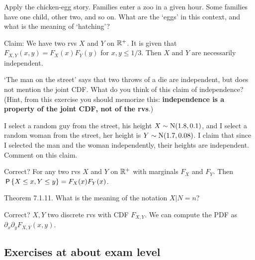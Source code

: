 \documentclass[assignments]{subfiles}
\begin{document}
\begin{exercise}
Apply the chicken-egg story. Families enter a zoo in a given hour. Some families have one child, other two, and so on. 
What are the `eggs' in this context, and what is the meaning of `hatching'? 
\end{exercise}


\begin{exercise}
Claim: We have two rvs $X$ and $Y$ on $\R^{+}$. It is given that $F_{X,Y}(x,y) = F_X(x)F_Y(y)$ for $x,y \leq 1/3$. Then  $X$ and $Y$ are necessarily independent. 
\end{exercise}

\begin{exercise}
`The man on the street' says that two throws of a die are independent, but does not mention the joint CDF.
What do you think of this claim of independence?
(Hint, from this exercise you should memorize this: \textbf{independence is a property of the joint CDF, not of the rvs}.)
\end{exercise}


\begin{exercise}
I select a random guy from the street, his height $X\sim\Norm{1.8, 0.1}$, and I select a random woman from the street, her height is $Y\sim\Norm{1.7, 0.08}$.
I claim that since I selected the man and the woman independently, their heights are independent.
Comment on this claim.
\end{exercise}


\begin{exercise}
Correct? For any two rvs $X$ and $Y$ on $\R^{+}$ with marginals $F_{X}$ and $F_{Y}$. Then $\P{X\leq x, Y\leq y} = F_{X}(x) F_{Y}(x)$.
\end{exercise}

\begin{exercise}
Theorem 7.1.11. What is the meaning of the notation $X|N=n$?
\end{exercise}

\begin{exercise}
Correct? $X, Y$ two discrete rvs with CDF $F_{X,Y}$. We can compute the PDF as $\partial_{x}\partial_{y} F_{X,Y}(x,y)$.
\end{exercise}


\subsection{Exercises at about exam level}
\label{sec:below-exam-level}
\end{document}
